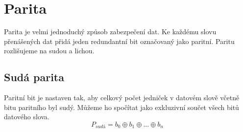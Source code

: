 
\section{Parita}
Parita je velmi jednoduchý způsob zabezpečení dat. Ke každému slovu přenášených dat přidá jeden redundantní bit označovaný jako paritní. Paritu rozlišujeme na sudou a lichou.

\subsection{Sudá parita}
Paritní bit je nastaven tak, aby celkový počet jedniček v datovém slově včetně bitu paritního byl sudý. Můžeme ho spočítat jako exkluzivní součet všech bitů datového slova.
$$ P_{sudá} = b_0 \oplus b_1 \oplus ... \oplus b_n $$

